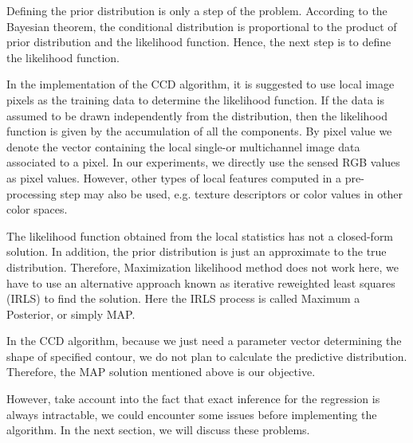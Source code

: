 Defining the prior distribution is only a step of the problem.
According to the Bayesian theorem, the conditional distribution
is proportional to the product of prior distribution and the likelihood
function. Hence, the next step is to define the likelihood function.

In the implementation of the CCD algorithm, it is suggested to use
local image pixels as the training data to determine the
likelihood function. If the data is assumed to be drawn  independently
from the distribution, then the likelihood function is given by the accumulation of all the components.
By pixel value we denote the vector containing the local single-or multichannel
image data associated to a pixel. In our experiments, we directly use the sensed RGB
values as pixel values. However, other types of local features computed in a pre-processing
step may also be used, e.g. texture descriptors or color values in
other color spaces.

The likelihood function obtained from the local statistics has
not a closed-form solution. In addition, the prior distribution is just
an approximate to the true distribution. Therefore, Maximization
likelihood method does not work here, we have to use an alternative
approach known as iterative reweighted least squares (IRLS) to find
the solution. Here the IRLS process is called Maximum a Posterior, or
simply MAP.

In the CCD algorithm, because we just need a parameter vector determining
the shape of specified contour, we do not plan to calculate the
predictive distribution. Therefore, the MAP solution mentioned above
is our objective.

However, take account into the fact that exact inference for the
regression is always intractable, we could encounter some issues before
implementing the algorithm. In the next section, we will discuss these
problems.


